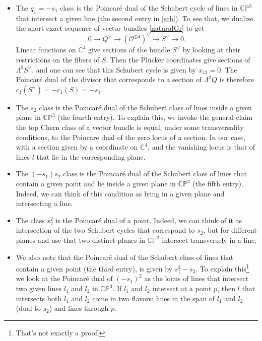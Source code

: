\documentclass[11pt]{article}
\numberwithin{equation}{section}
\numberwithin{footnote}{section}
\renewcommand{\P}{{\mathbb P}}
\newcommand{\C}{{\mathbb C}}
\begin{document}
\begin{itemize}
\item
The $q_1=-s_1$ class is the Poincar\'e dual of the Schubert cycle of lines in $\C\P^3$ that intersect a given line (the second entry in \eqref{sch}). To see that, we dualize the short exact sequence of vector bundles \eqref{naturalGr} to get
$$
0\to Q^\vee \to( \mathcal  O^{\oplus 4})^\vee \to S^\vee \to 0.
$$
Linear functions on $\C^4$ give sections of the bundle $S^\vee$ by looking at their restrictions on
the fibers of $S$. Then the Pl\"ucker coordinates give sections of $\Lambda^2 S^\vee$, and one can see that this Schubert cycle is given by $x_{12}=0$.
The Poincar\'e dual of the divisor that corresponds to a section of $\Lambda^2 Q$ is therefore $c_1(S^\vee)=-c_1(S)=-s_1$.

\item The $s_2$ class is the Poincar\'e dual of the Schubert class of lines inside a given plane in $\C\P^3$ (the fourth entry).
To explain this, we invoke the general claim the top Chern class of a vector bundle is equal, under some transversality conditions, to the Poincare dual of the zero locus of a section. In our case, with a section given by a coordinate on $\C^4$, 
and the vanishing locus is that of lines $l$ that lie in the corresponding plane.

\item The $(-s_1)s_2$ class is the Poincar\'e dual of the Schubert class of lines that contain a given point and lie inside a given plane in $\C\P^3$ (the fifth entry). Indeed, we can think of this condition as lying in a given plane and intersecting a 
line.

\item The class $s_2^2$ is the Poincar\'e dual of a point. Indeed, we can think of it as intersection of the two Schubert cycles that correspond to $s_2$, but for different planes and use that two distinct planes in $\C\P^2$ intersect transversely in a line.

\item We also note that the Poincar\'e dual of the Schubert class of lines that contain a given point (the third entry), is given by $s_1^2 -s_2$. To explain this\footnote{ That's not exactly a proof.} we look at the Poincar\'e dual of $(-s_1)^2$ as the locus of lines that
intersect two given lines $l_1$ and $l_2$ in $\C\P^3$. If $l_1$ and $l_2$ intersect at a point $p$, then $l$ that intersects both $l_1$ and $l_2$ come in two flavors: lines in the span of $l_1$ and $l_2$ (dual to $s_2$) and lines through $p$.
\end{itemize}
\end{document}
